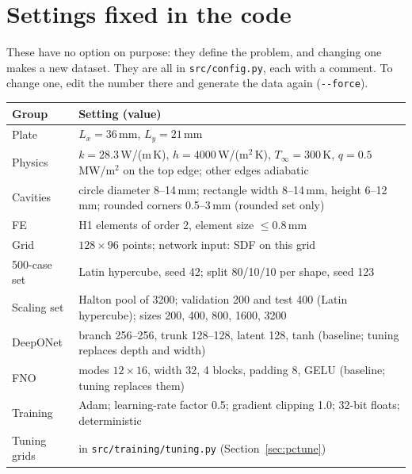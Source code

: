 \documentclass[11pt,a4paper]{article}
\newcommand{\code}[1]{\lstinline{#1}}
\begin{document}
\section{Settings fixed in the code}\label{sec:settings}

These have no option on purpose: they define the problem, and changing one makes a new
dataset. They are all in \code{src/config.py}, each with a comment. To change one, edit the
number there and generate the data again (\code{--force}).

\begin{center}
\small
\begin{tabularx}{\textwidth}{@{}lY@{}}
\toprule
Group & Setting (value) \\
\midrule
Plate        & $L_x = 36$\,mm, $L_y = 21$\,mm \\
Physics      & $k = 28.3$\,W/(m\,K), $h = 4000$\,W/(m$^2$\,K), $T_\infty = 300$\,K,
               $q = 0.5$\,MW/m$^2$ on the top edge; other edges adiabatic \\
Cavities     & circle diameter 8--14\,mm; rectangle width 8--14\,mm, height 6--12\,mm;
               rounded corners 0.5--3\,mm (rounded set only) \\
FE           & H1 elements of order 2, element size $\le 0.8$\,mm \\
Grid         & $128 \times 96$ points; network input: SDF on this grid \\
500-case set & Latin hypercube, seed 42; split 80/10/10 per shape, seed 123 \\
Scaling set  & Halton pool of 3200; validation 200 and test 400 (Latin hypercube);
               sizes 200, 400, 800, 1600, 3200 \\
DeepONet     & branch 256--256, trunk 128--128, latent 128, tanh (baseline; tuning replaces depth and width) \\
FNO          & modes $12 \times 16$, width 32, 4 blocks, padding 8, GELU (baseline; tuning replaces them) \\
Training     & Adam; learning-rate factor 0.5; gradient clipping 1.0; 32-bit floats; deterministic \\
Tuning grids & in \code{src/training/tuning.py} (Section~\ref{sec:pctune}) \\
\bottomrule
\end{tabularx}
\end{center}
\end{document}
